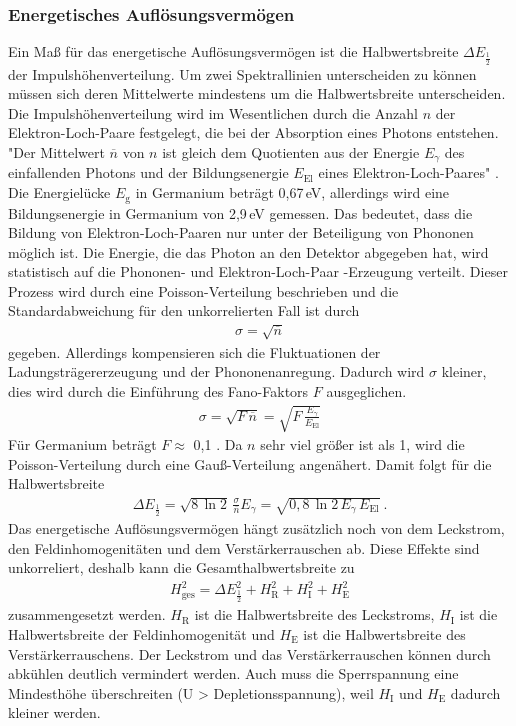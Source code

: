 \subsubsection{Energetisches Auflösungsvermögen}
\label{sec:EAuflösung}
Ein Maß für das energetische Auflösungsvermögen ist die Halbwertsbreite $\Delta E_\frac{1}{2}$ der Impulshöhenverteilung. Um zwei Spektrallinien unterscheiden zu können müssen sich deren Mittelwerte mindestens um die Halbwertsbreite unterscheiden. \\
Die Impulshöhenverteilung wird im Wesentlichen durch die Anzahl $n$ der Elektron-Loch-Paare festgelegt, die bei der Absorption eines Photons entstehen. "Der Mittelwert $\overline{n}$ von $n$ ist gleich dem Quotienten aus der Energie $E_\gamma$ des einfallenden Photons und der Bildungsenergie $E_\text{El}$ eines Elektron-Loch-Paares" \cite[14]{V18}. Die Energielücke $E_\text{g}$ in Germanium beträgt 0,67\,eV, allerdings wird eine Bildungsenergie in Germanium von 2,9\,eV gemessen. Das bedeutet, dass die Bildung von Elektron-Loch-Paaren nur unter der Beteiligung von Phononen möglich ist. Die Energie, die das Photon an den Detektor abgegeben hat, wird statistisch auf die Phononen- und Elektron-Loch-Paar -Erzeugung verteilt. Dieser Prozess wird durch eine Poisson-Verteilung beschrieben und die Standardabweichung für den unkorrelierten Fall ist durch
\begin{align}
	\sigma = \sqrt{\overline{n}}
\end{align}
gegeben. Allerdings kompensieren sich die Fluktuationen der Ladungsträgererzeugung und der Phononenanregung. Dadurch wird $\sigma$ kleiner, dies wird durch die Einführung des Fano-Faktors $F$ ausgeglichen.
\begin{align}
	\sigma = \sqrt{F\,\overline{n}} = \sqrt{F\,\frac{E_\gamma}{E_\text{El}}}
\end{align}
Für Germanium beträgt $F \approx$ 0,1 \cite[15]{V18}. Da $n$ sehr viel größer ist als 1, wird die Poisson-Verteilung durch eine Gauß-Verteilung angenähert. Damit folgt für die Halbwertsbreite
\begin{align}
	\Delta E_\frac{1}{2} = \sqrt{8\,\ln2} \, \frac{\sigma} {\overline{n}} E_\gamma = \sqrt{0,8\,\ln2\,E_\gamma \, E_\text{El}} \ .
	\label{eqn:Halbwertsbreite}
\end{align}
Das energetische Auflösungsvermögen hängt zusätzlich noch von dem Leckstrom, den Feldinhomogenitäten und dem Verstärkerrauschen ab. Diese Effekte sind unkorreliert, deshalb kann die Gesamthalbwertsbreite zu
\begin{align}
	H_\text{ges}^2 = \Delta E_\frac{1}{2}^2 + H_\text{R}^2 + H_\text{I}^2 + H_\text{E}^2
\end{align}
zusammengesetzt werden. $H_\text{R}$ ist die Halbwertsbreite des Leckstroms, $H_\text{I}$ ist die Halbwertsbreite der Feldinhomogenität und $H_\text{E}$ ist die Halbwertsbreite des Verstärkerrauschens. Der Leckstrom und das Verstärkerrauschen können durch abkühlen deutlich vermindert werden. Auch muss die Sperrspannung eine Mindesthöhe überschreiten (U > Depletionsspannung), weil $H_\text{I}$ und $H_\text{E}$ dadurch kleiner werden.




